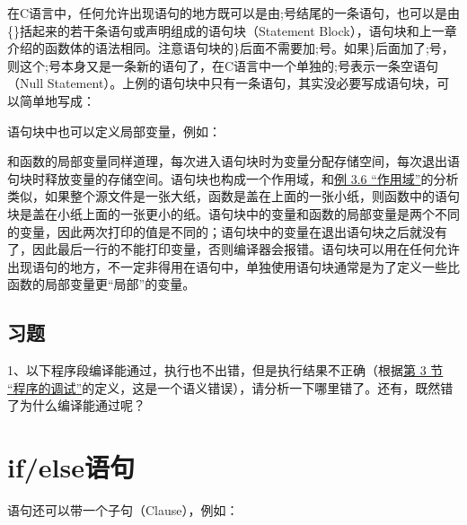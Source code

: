 在C语言中，任何允许出现语句的地方既可以是由;号结尾的一条语句，也可以是由\{\}括起来的若干条语句或声明组成的语句块（Statement Block），语句块和上一章介绍的函数体的语法相同。注意语句块的\}后面不需要加;号。如果\}后面加了;号，则这个;号本身又是一条新的语句了，在C语言中一个单独的;号表示一条空语句（Null Statement）。上例的语句块中只有一条语句，其实没必要写成语句块，可以简单地写成：




语句块中也可以定义局部变量，例如：




和函数的局部变量同样道理，每次进入语句块时为变量分配存储空间，每次退出语句块时释放变量的存储空间。语句块也构成一个作用域，和\hyperlink{db.ch03s04.id2714690}{例 3.\BookSplit{}6 “作用域”}的分析类似，如果整个源文件是一张大纸，函数是盖在上面的一张小纸，则函数中的语句块是盖在小纸上面的一张更小的纸。语句块中的变量和函数的局部变量是两个不同的变量，因此两次打印的值是不同的；语句块中的变量在退出语句块之后就没有了，因此最后一行的不能打印变量，否则编译器会报错。语句块可以用在任何允许出现语句的地方，不一定非得用在语句中，单独使用语句块通常是为了定义一些比函数的局部变量更“局部”的变量。


\subsection*{习题}
%


1、以下程序段编译能通过，执行也不出错，但是执行结果不正确（根据\hyperlink{db.ch01s03.id2704937}{第 3 节 “程序的调试”}的定义，这是一个语义错误），请分析一下哪里错了。还有，既然错了为什么编译能通过呢？






\section{if/else语句}
%
语句还可以带一个子句（Clause），例如：


